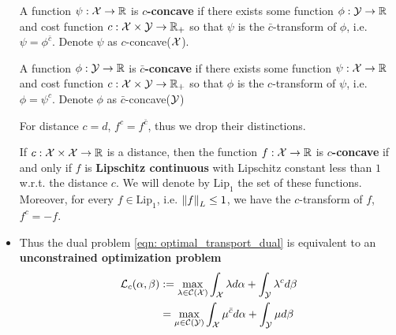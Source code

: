 \documentclass[11pt]{article}
\begin{document}
\begin{itemize}
A function $\psi: {\mathcal X} \rightarrow {\mathbb R}$ is \textbf{$c$-concave} if there exists some function $\phi: {\mathcal Y} \rightarrow {\mathbb R}$ and cost function $c: {\mathcal X} \times {\mathcal Y} \rightarrow {\mathbb R}_{+}$ so that $\psi$ is the $\bar{c}$-transform of $\phi$, i.e. 
$\psi = \phi^{\bar{c}}$. Denote $\psi$ as $c$-concave(${\mathcal X}$).

A function $\phi: {\mathcal Y} \rightarrow {\mathbb R}$ is \textbf{$\bar{c}$-concave} if there exists some function $\psi: {\mathcal X} \rightarrow {\mathbb R}$ and cost function $c: {\mathcal X} \times {\mathcal Y} \rightarrow {\mathbb R}_{+}$ so that $\phi$ is the $c$-transform of $\psi$, i.e. 
$\phi = \psi^{c}$. Denote $\phi$ as $\bar{c}$-concave(${\mathcal Y}$)

For distance $c=d$, $f^{c} = f^{\bar{c}}$, thus we drop their distinctions.

\begin{proposition}
If $c: {\mathcal X} \times {\mathcal X}\rightarrow {\mathbb R}$ is a distance, then the function $f: {\mathcal X} \rightarrow {\mathbb R}$ is \textbf{$c$-concave} if and only if $f$ is \textbf{Lipschitz continuous} with Lipschitz constant less than $1$ w.r.t. the distance $c$.  We will denote by $\text{Lip}_1$ the set of these functions. Moreover, for every $f \in \text{Lip}_1$, i.e. $\left\|f\right\|_{L} \le 1$, we have the $c$-transform of $f$, $f^{c} = -f$. \citep{santambrogio2015optimal}
\end{proposition}

\item Thus the dual problem \eqref{eqn: optimal_transport_dual} is equivalent to an \textbf{unconstrained optimization problem}
\begin{align}
{\mathcal L}_{c}(\alpha, \beta)&:= \max_{\lambda \in {\mathcal C}({\mathcal X})} \int_{{\mathcal X}}\lambda d\alpha + \int_{{\mathcal Y}} \lambda^{c} d\beta   \label{eqn: optimal_transport_dual_c_transform_prob} \\
&= \max_{\mu \in  {\mathcal C}({\mathcal Y})} \int_{{\mathcal X}}\mu^{\bar{c}} d\alpha + \int_{{\mathcal Y}} \mu d\beta  \label{eqn: optimal_transport_dual_c_concave_prob}
\end{align}
\end{itemize}


\newpage
\end{document}
